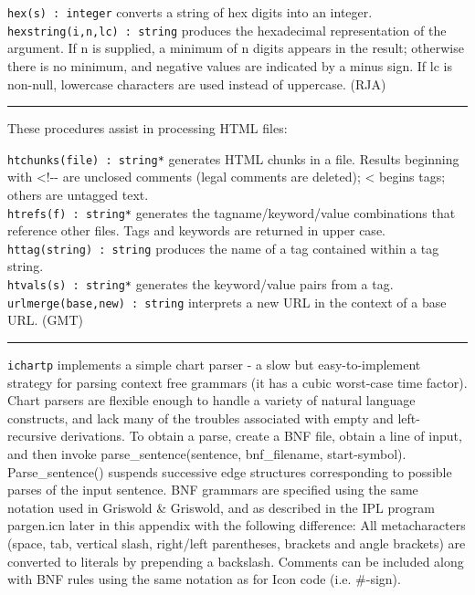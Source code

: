\texttt{hex(s) : integer} converts a string of hex digits into an
integer.\\
\texttt{hexstring(i,n,lc) : string} produces the
hexadecimal representation of the argument. If n is
supplied, a minimum of n digits appears in the result; otherwise there
is no minimum, and negative values are indicated by a minus sign. If lc
is non-null, lowercase characters are used instead of uppercase. (RJA)

\vspace{0.25cm}\hrule{}

These procedures assist in processing HTML files:

\texttt{htchunks(file) : string*} generates HTML chunks in a
file. Results beginning with {\textless}!-{}- are unclosed comments
(legal comments are deleted); {\textless} begins tags; others are
untagged text.\\
\texttt{htrefs(f) : string*} generates the tagname/keyword/value
combinations that reference other files. Tags and
keywords are returned in upper case.\\
\texttt{httag(string) : string} produces the name of a tag contained
within a tag string.\\
\texttt{htvals(s) : string*} generates the keyword/value pairs from a
tag.\\
\texttt{urlmerge(base,new) : string} interprets a new URL in the context
of a base URL. (GMT)

\vspace{0.25cm}\hrule{}

\texttt{ichartp} implements a simple chart
parser - a slow but easy-to-implement strategy for parsing
context free grammars (it has a cubic worst-case time factor). Chart
parsers are flexible enough to handle a variety of natural language
constructs, and lack many of the troubles associated with empty and
left-recursive derivations. To obtain a parse, create a BNF
file, obtain a line of input, and then invoke parse\_sentence(sentence,
bnf\_filename, start-symbol). Parse\_sentence() suspends successive
edge structures corresponding to possible parses of the input sentence.
BNF grammars are specified using the same notation used in Griswold \&
Griswold, and as described in the IPL program
{\textquotedbl}pargen.icn{\textquotedbl} later in this appendix with
the following difference: All metacharacters (space, tab, vertical
slash, right/left parentheses, brackets and angle brackets) are
converted to literals by prepending a backslash. Comments can be
included along with BNF rules using the same notation as for Icon code
(i.e. \#-sign).

